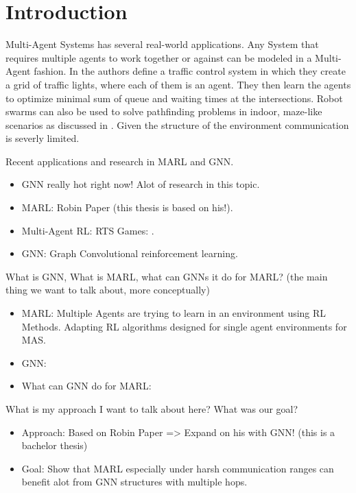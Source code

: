 
\chapter{Introduction}
Multi-Agent Systems has several real-world applications. Any System that requires multiple agents to work together or against can be modeled in a Multi-Agent fashion. In \citet{MARLTraffic2020} the authors define a traffic control system in which they create a grid of traffic lights, where each of them is an agent. They then learn the agents to optimize minimal sum of queue and waiting times at the intersections. Robot swarms can also be used to solve pathfinding problems in indoor, maze-like scenarios as discussed in \citet{SwarmPathFinding2013}. Given the structure of the environment communication is severly limited. 
\par

Recent applications and research in MARL and GNN.
\begin{itemize}[noitemsep,nolistsep]
	\item GNN really hot right now! Alot of research in this topic.
	\item MARL: Robin Paper (this thesis is based on his!). 
	\item Multi-Agent RL: RTS Games: \citet{RTSMARL2021}.
	\item GNN: Graph Convolutional reinforcement learning.
\end{itemize} \par

What is GNN, What is MARL, what can GNNs it do for MARL? (the main thing we want to talk about, more conceptually)
\begin{itemize}[noitemsep,nolistsep]
	\item MARL: Multiple Agents are trying to learn in an environment using RL Methods. Adapting RL algorithms designed for single agent environments for MAS.
	\item GNN: 
	\item What can GNN do for MARL:
\end{itemize} \par

What is my approach I want to talk about here? What was our goal?
\begin{itemize}[noitemsep,nolistsep]
	\item Approach: Based on Robin Paper => Expand on his with GNN! (this is a bachelor thesis)
	\item Goal: Show that MARL especially under harsh communication ranges can benefit alot from GNN structures with multiple hops.
\end{itemize} \par

